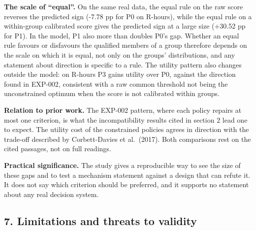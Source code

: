 \documentclass[
]{article}
\begin{document}
\textbf{The scale of ``equal''.} On the same real data, the equal rule
on the raw score reverses the predicted sign (-7.78 pp for P0 on
R-hours), while the equal rule on a within-group calibrated score gives
the predicted sign at a large size (+30.52 pp for P1). In the model, P1
also more than doubles P0's gap. Whether an equal rule favours or
disfavours the qualified members of a group therefore depends on the
scale on which it is equal, not only on the groups' distributions, and
any statement about direction is specific to a rule. The utility pattern
also changes outside the model: on R-hours P3 gains utility over P0,
against the direction found in EXP-002, consistent with a raw common
threshold not being the unconstrained optimum when the score is not
calibrated within groups.

\textbf{Relation to prior work.} The EXP-002 pattern, where each policy
repairs at most one criterion, is what the incompatibility results cited
in section 2 lead one to expect. The utility cost of the constrained
policies agrees in direction with the trade-off described by
Corbett-Davies et al.~(2017). Both comparisons rest on the cited
passages, not on full readings.

\textbf{Practical significance.} The study gives a reproducible way to
see the size of these gaps and to test a mechanism statement against a
design that can refute it. It does not say which criterion should be
preferred, and it supports no statement about any real decision system.

\subsection{7. Limitations and threats to
validity}\label{limitations-and-threats-to-validity}
\end{document}
